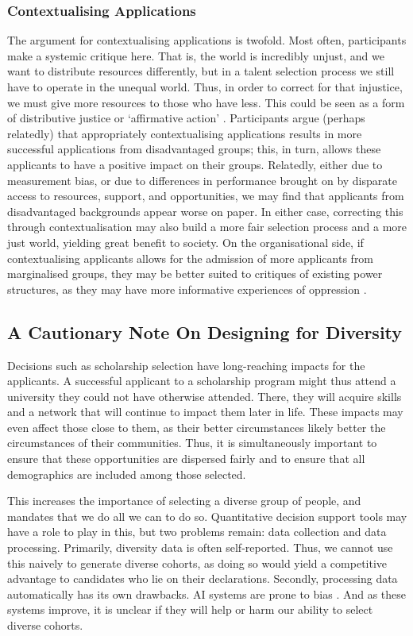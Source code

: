 \subsubsection{Contextualising Applications}
The argument for contextualising applications is twofold. Most often, participants make a systemic critique here. That is, the world is incredibly unjust, and we want to distribute resources differently, but in a talent selection process we still have to operate in the unequal world. Thus, in order to correct for that injustice, we must give more resources to those who have less. This could be seen as a form of distributive justice or `affirmative action' \cite{Olsaretti_2018}. Participants argue (perhaps relatedly) that appropriately contextualising applications results in more successful applications from disadvantaged groups; this, in turn, allows these applicants to have a positive impact on their groups. Relatedly, either due to measurement bias, or due to differences in performance brought on by disparate access to resources, support, and opportunities, we may find that applicants from disadvantaged backgrounds appear worse on paper. In either case, correcting this through contextualisation may also build a more fair selection process and a more just world, yielding great benefit to society. On the organisational side, if contextualising applicants allows for the admission of more applicants from marginalised groups, they may be better suited to critiques of existing power structures, as they may have more informative experiences of oppression \cite{mills2015blackness}.

\subsection{A Cautionary Note On Designing for Diversity}
Decisions such as scholarship selection have long-reaching impacts for the applicants. A successful applicant to a scholarship program might thus attend a university they could not have otherwise attended. There, they will acquire skills and a network that will continue to impact them later in life. These impacts may even affect those close to them, as their better circumstances likely better the circumstances of their communities. Thus, it is simultaneously important to ensure that these opportunities are dispersed fairly and to ensure that all demographics are included among those selected.

This increases the importance of selecting a diverse group of people, and mandates that we do all we can to do so. Quantitative decision support tools may have a role to play in this, but two problems remain: data collection and data processing. Primarily, diversity data is often self-reported. Thus, we cannot use this naively to generate diverse cohorts, as doing so would yield a competitive advantage to candidates who lie on their declarations. Secondly, processing data automatically has its own drawbacks. AI systems are prone to bias \cite{Friedler_Scheidegger_Venkatasubramanian_2016}. And as these systems improve, it is unclear if they will help or harm our ability to select diverse cohorts.

